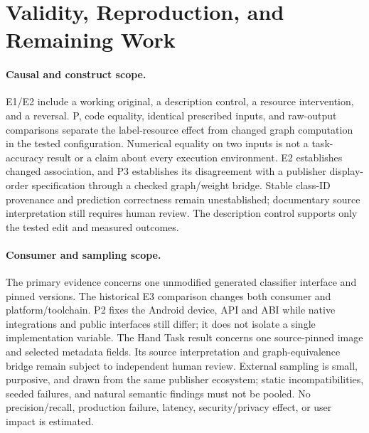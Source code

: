 \documentclass[10pt,twocolumn,letterpaper]{article}
\begin{document}
\section{Validity, Reproduction, and Remaining Work}
\paragraph{Causal and construct scope.}
E1/E2 include a working original, a description control, a resource intervention, and a reversal. P, code equality, identical prescribed inputs, and raw-output comparisons separate the label-resource effect from changed graph computation in the tested configuration. Numerical equality on two inputs is not a task-accuracy result or a claim about every execution environment. E2 establishes changed association, and P3 establishes its disagreement with a publisher display-order specification through a checked graph/weight bridge. Stable class-ID provenance and prediction correctness remain unestablished; documentary source interpretation still requires human review. The description control supports only the tested edit and measured outcomes.

\paragraph{Consumer and sampling scope.}
The primary evidence concerns one unmodified generated classifier interface and pinned versions. The historical E3 comparison changes both consumer and platform/toolchain. P2 fixes the Android device, API and ABI while native integrations and public interfaces still differ; it does not isolate a single implementation variable. The Hand Task result concerns one source-pinned image and selected metadata fields. Its source interpretation and graph-equivalence bridge remain subject to independent human review. External sampling is small, purposive, and drawn from the same publisher ecosystem; static incompatibilities, seeded failures, and natural semantic findings must not be pooled. No precision/recall, production failure, latency, security/privacy effect, or user impact is estimated.
\end{document}
